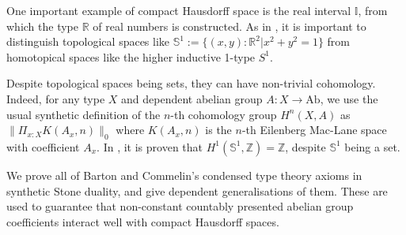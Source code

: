 \documentclass[letterpaper]{../util/easychair}
\newcommand{\R}{\mathbb{R}}
\newcommand{\Z}{\mathbb{Z}}
\newcommand{\N}{\mathbb{N}}
\newcommand{\I}{\mathbb{I}}
\newcommand{\bS}{\mathbb{S}}
\begin{document}
One important example of compact Hausdorff space is the real interval $\I$, from which the type $\R$  of real numbers is constructed.
As in \cite{shulman-Brouwer-fixed-point}, it is important to distinguish topological spaces like $\bS^1:=\{(x,y):\R^2\vert x^2+y^2=1\}$ from homotopical spaces like the higher inductive 1-type $S^1$.

Despite topological spaces being sets, they can have non-trivial cohomology. Indeed, for any type $X$ and dependent abelian group $A:X\to \mathrm{Ab}$, we use the usual synthetic definition of the $n$-th cohomology group $H^n(X,A)$ as $\|\Pi_{x:X}K(A_x,n)\|_0$ where $K(A_x,n)$ is the $n$-th Eilenberg Mac-Lane space with coefficient $A_x$. In \cite{synthetic-stone-duality}, it is proven that $H^1(\bS^1,\Z)=\Z$, despite $\bS^1$ being a set.

We prove all of Barton and Commelin's condensed type theory axioms in synthetic Stone duality, and give dependent generalisations of them. These are used to guarantee that non-constant countably presented abelian group coefficients interact well with compact Hausdorff spaces.



\end{document}
